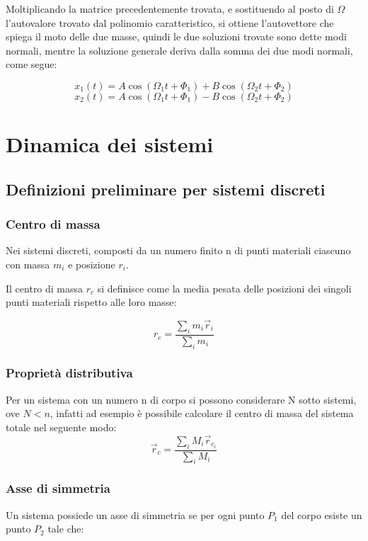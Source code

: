 \documentclass[11pt, a4paper, openright]{book}
\theoremstyle{plain}
\theoremstyle{definition}
\begin{document}
Moltiplicando la matrice precedentemente trovata, e sostituendo al posto di $\Omega$ l'autovalore trovato dal polinomio caratteristico, si ottiene l'autovettore che spiega il moto delle due masse, quindi le due soluzioni trovate sono dette modi normali, mentre la soluzione generale deriva dalla somma dei due modi normali, come segue:

\[x_1(t) = A\cos(\Omega_1 t + \Phi_1) + B\cos(\Omega_2 t + \Phi_2) \]
\[x_2(t) = A\cos(\Omega_1 t + \Phi_1) - B\cos(\Omega_2 t + \Phi_2) \]

\newpage

\chapter{Dinamica dei sistemi}

\section{Definizioni preliminare per sistemi discreti}

\subsection{Centro di massa}
Nei sistemi discreti, composti da un numero finito n di punti materiali ciascuno con massa $m_i$ e posizione $r_i$. 

Il centro di massa $r_c$ si definisce come la media pesata delle posizioni dei singoli punti materiali rispetto alle loro masse:

\begin{equation}
    r_c = \frac{\sum_i m_i\vec{r}_i}{\sum_i m_i}
\end{equation}

\subsection{Proprietà distributiva}
Per un sistema con un numero n di corpo si possono considerare N sotto sistemi, ove $N < n$, infatti ad esempio è possibile calcolare il centro di massa del sistema totale nel seguente modo:
\begin{equation}
    \vec{r}_c = \frac{\sum_i M_i\vec{r}_{c_i}}{\sum_i M_i}
\end{equation}

\subsection{Asse di simmetria}
Un sistema possiede un asse di simmetria se per ogni punto $P_1$ del corpo esiste un punto $P_2$ tale che:
\end{document}
